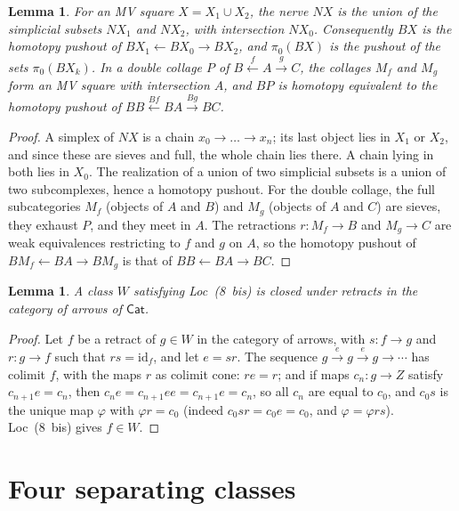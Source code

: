\documentclass[11pt,a4paper]{article}
\newtheorem{lemma}[theorem]{Lemma}
\theoremstyle{definition}
\newcommand{\Cat}{\mathsf{Cat}}
\newcommand{\id}{\mathrm{id}}
\begin{document}
\begin{lemma}\label{lem:mv}
For an MV square $X=X_1\cup X_2$, the nerve $NX$ is the union of the simplicial subsets
$NX_1$ and $NX_2$, with intersection $NX_0$. Consequently $BX$ is the homotopy pushout of
$BX_1\leftarrow BX_0\to BX_2$, and $\pi_0(BX)$ is the pushout of the sets $\pi_0(BX_k)$. In a
double collage $P$ of $B\xleftarrow{f}A\xrightarrow{g}C$, the collages $M_f$ and $M_g$ form an
MV square with intersection $A$, and $BP$ is homotopy equivalent to the homotopy pushout of
$BB\xleftarrow{Bf}BA\xrightarrow{Bg}BC$.
\end{lemma}

\begin{proof}
A simplex of $NX$ is a chain $x_0\to\dots\to x_n$; its last object lies in $X_1$ or $X_2$, and
since these are sieves and full, the whole chain lies there. A chain lying in both lies in
$X_0$. The realization of a union of two simplicial subsets is a union of two subcomplexes, hence
a homotopy pushout. For the double collage, the full subcategories $M_f$ (objects of $A$ and
$B$) and $M_g$ (objects of $A$ and $C$) are sieves, they exhaust $P$, and they meet in $A$. The
retractions $r\colon M_f\to B$ and $M_g\to C$ are weak equivalences restricting to $f$ and
$g$ on $A$, so the homotopy pushout of $BM_f\leftarrow BA\to BM_g$ is that of
$BB\leftarrow BA\to BC$.
\end{proof}

\begin{lemma}\label{lem:retracts}
A class $W$ satisfying Loc~\textup{(8~bis)} is closed under retracts in the category of
arrows of $\Cat$.
\end{lemma}

\begin{proof}
Let $f$ be a retract of $g\in W$ in the category of arrows, with $s\colon f\to g$ and
$r\colon g\to f$ such that $rs=\id_f$, and let $e=sr$. The sequence
$g\xrightarrow{e}g\xrightarrow{e}g\to\cdots$ has colimit $f$, with the maps $r$ as colimit
cone: $re=r$; and if maps $c_n\colon g\to Z$ satisfy $c_{n+1}e=c_n$, then
$c_ne=c_{n+1}ee=c_{n+1}e=c_n$, so all $c_n$ are equal to $c_0$, and $c_0s$ is the unique map
$\varphi$ with $\varphi r=c_0$ (indeed $c_0sr=c_0e=c_0$, and $\varphi=\varphi rs$). Loc~(8~bis)
gives $f\in W$.
\end{proof}

\section{Four separating classes}\label{sec:examples}
\end{document}
